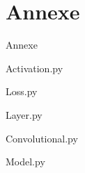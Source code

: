 \section{Annexe}
\begin{frame}{Annexe}

\end{frame}

\begin{frame}{Activation.py}
    
\end{frame}

\begin{frame}{Loss.py}
    
\end{frame}

\begin{frame}{Layer.py}
    
\end{frame}

\begin{frame}{Convolutional.py}
    

\end{frame}

\begin{frame}{Model.py}
    
\end{frame}





